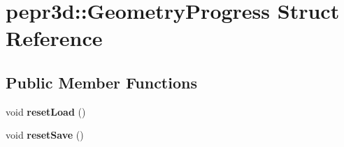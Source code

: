 \hypertarget{structpepr3d_1_1_geometry_progress}{}\section{pepr3d\+::Geometry\+Progress Struct Reference}
\label{structpepr3d_1_1_geometry_progress}
\subsection*{Public Member Functions}
\begin{DoxyCompactItemize}
\item 
\mbox{\label{structpepr3d_1_1_geometry_progress_ab944febac0a583ad7d84a3a256bfff6c}} 
void {\bfseries reset\+Load} ()
\item 
\mbox{\label{structpepr3d_1_1_geometry_progress_a7ae0e47843993e4c2513dfbfb9ad2461}} 
void {\bfseries reset\+Save} ()
\end{DoxyCompactItemize}
